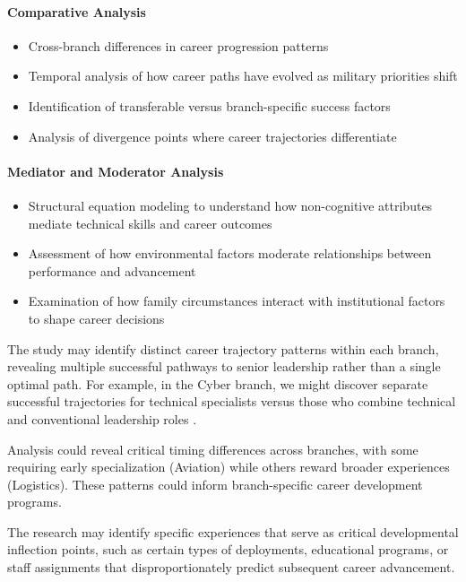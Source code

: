 \documentclass[../main.tex]{subfiles}
\begin{document}
\paragraph{Comparative Analysis}
\begin{itemize}
\item Cross-branch differences in career progression patterns
\item Temporal analysis of how career paths have evolved as military priorities shift
\item Identification of transferable versus branch-specific success factors
\item Analysis of divergence points where career trajectories differentiate
\end{itemize}

\paragraph{Mediator and Moderator Analysis}
\begin{itemize}
\item Structural equation modeling to understand how non-cognitive attributes mediate technical skills and career outcomes
\item Assessment of how environmental factors moderate relationships between performance and advancement
\item Examination of how family circumstances interact with institutional factors to shape career decisions
\end{itemize}


The study may identify distinct career trajectory patterns within each branch, revealing multiple successful pathways to senior leadership rather than a single optimal path. For example, in the Cyber branch, we might discover separate successful trajectories for technical specialists versus those who combine technical and conventional leadership roles \parencite{joseph2012career}.

Analysis could reveal critical timing differences across branches, with some requiring early specialization (Aviation) while others reward broader experiences (Logistics). These patterns could inform branch-specific career development programs.

The research may identify specific experiences that serve as critical developmental inflection points, such as certain types of deployments, educational programs, or staff assignments that disproportionately predict subsequent career advancement.
\end{document}
